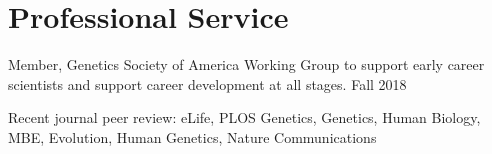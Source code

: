 \documentclass[letterpaper]{article}
\renewenvironment{itemize}{
  \begin{list}{}{
    \setlength{\leftmargin}{1.5em}
  }
}{
  \end{list}
}
\begin{document}
\section*{Professional Service}
\begin{itemize}

\item Member, Genetics Society of America Working Group to support early career scientists and support career development at all stages. Fall 2018
\item Recent journal peer review: eLife, PLOS Genetics, Genetics, Human Biology, MBE, Evolution, Human Genetics, Nature Communications

\end{itemize}
\end{document}

